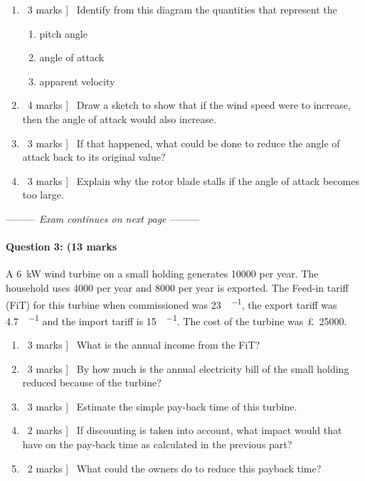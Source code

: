 \documentclass[a4paper,12pt,fleqn]{article}
\newcommand{\middlewords}{Exam continues on next page}
\begin{document}
\begin{enumerate} [label=\alph*)]
\item \lbrack\ 3 marks ] \ Identify from this diagram the quantities that represent the 
    \begin{enumerate} [label=\roman*)]
        \item pitch angle
        \item angle of attack
        \item apparent velocity
    \end{enumerate}
\item \lbrack\ 4 marks ] \ Draw a sketch to show that if the wind speed were to increase, then the angle of attack would also increase.
\item \lbrack\ 3 marks ] \ If that happened, what could be done to reduce the angle of attack back to its original value?
\item \lbrack\ 3 marks ] \ Explain why the rotor blade stalls if the angle of attack becomes too large.
\end{enumerate}

\begin{center}
\vspace{3cm}
--------- \textit{\middlewords} ---------
\end{center}
\newpage

\paragraph{\textbf{Question 3: (13 marks}}
A \SI{6}{\kilo\watt} wind turbine on a small holding generates \SI{10000}{\kilowatthour} per year. The household uses \SI{4000}{\kilowatthour}
per year and \SI{8000}{\kilowatthour} per year is exported. The Feed-in tariff (FiT) for this turbine when commissioned was \SI{23}{\pence\per\kilowatthour},
the export tariff was \SI{4.7}{\pence\per\kilowatthour} and the import tariff is \SI{15}{\pence\per\kilowatthour}. 
The cost of the turbine was \SI{25000}[\pounds]{}.
\begin {enumerate} [label=\alph*)]
\item \lbrack\ 3 marks ] \ What is the annual income from the FiT?
\item \lbrack\ 3 marks ] \ By how much is the annual electricity bill of the small holding reduced because of the turbine?
\item \lbrack\ 3 marks ] \ Estimate the simple pay-back time of this turbine.
\item \lbrack\ 2 marks ] \ If discounting is taken into account, what impact would that have on the pay-back time as calculated in the previous part?
\item \lbrack\ 2 marks ] \  What could the owners do to reduce this payback time?
\end{enumerate}
\end{document}
